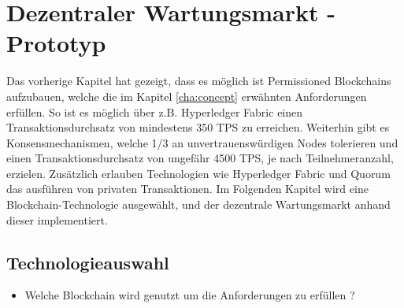 \chapter{Dezentraler Wartungsmarkt - Prototyp}
\label{cha:wartungsmarkt-impl}

Das vorherige Kapitel hat gezeigt, dass es möglich ist Permissioned Blockchains aufzubauen, welche die im Kapitel \ref{cha:concept} erwähnten Anforderungen erfüllen. So ist es möglich über z.B. Hyperledger Fabric einen Transaktionsdurchsatz von mindestens 350 TPS zu erreichen. Weiterhin gibt es Konsensmechanismen, welche 1/3 an unvertrauenswürdigen Nodes tolerieren und einen Transaktionsdurchsatz von ungefähr 4500 TPS, je nach Teilnehmeranzahl, erzielen. Zusätzlich erlauben Technologien wie Hyperledger Fabric und Quorum das ausführen von privaten Transaktionen. Im Folgenden Kapitel wird eine Blockchain-Technologie ausgewählt, und der dezentrale Wartungsmarkt anhand dieser implementiert.  
  
\section{Technologieauswahl}


\begin{itemize}
    \item Welche Blockchain wird genutzt um die Anforderungen zu erfüllen ?
\end{itemize}


\label{sec:hyperledger-fabric-composer}
